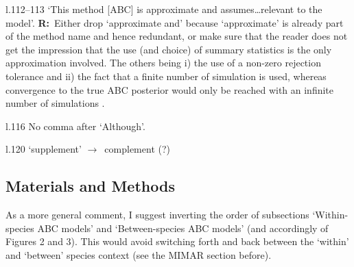 \documentclass[11pt]{article}
\newenvironment{my_description}
{\begin{description}
  \setlength{\itemsep}{2pt}
  \setlength{\parskip}{0pt}
  \setlength{\parsep}{0pt}}
{\end{description}}
\newcommand{\ra}{$\rightarrow$\ }
\newcommand{\R}{\textbf{R:}\ }
\begin{document}
\begin{my_description}
	\item[l.112--113] `This method [ABC] is approximate and assumes\dots relevant to the model'. \R Either drop `approximate and' because `approximate' is already part of the method name and hence redundant, or make sure that the reader does not get the impression that the use (and choice) of summary statistics is the only approximation involved. The others being i) the use of a non-zero rejection tolerance and ii) the fact that a finite number of simulation is used, whereas convergence to the true ABC posterior would only be reached with an infinite number of simulations \citep[see one of the recent ABC reviews, \emph{e.g.}][]{Beaumont:2010uq}.
	\item[l.116] No comma after `Although'.
	\item[l.120] `supplement' \ra complement (?)

\end{my_description}



\subsection{Materials and Methods}
As a more general comment, I suggest inverting the order of subsections `Within-species ABC models' and `Between-species ABC models' (and accordingly of Figures 2 and 3). This would avoid switching forth and back between the `within' and `between' species context (see the \textsc{MIMAR} section before).
\end{document}

